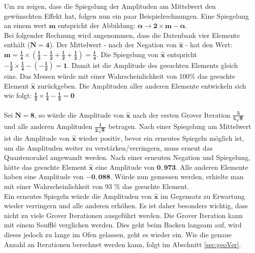 \noindent
Um zu zeigen, dass die Spiegelung der Amplituden am Mittelwert den gewünschten Effekt hat, folgen nun ein paar Beispielrechnungen. Eine Spiegelung an einem wert $\mathbf{m}$ entspricht der Abbildung: $\mathbf{\alpha \rightarrow 2 \times m - \alpha}$. \\
Bei folgender Rechnung wird angenommen, dass die Datenbank vier Elemente enthält ($\mathbf{N=4}$). Der Mittelwert - nach der Negation von $\mathbf{\hat x}$ - hat den Wert: $\mathbf{m = \frac{1}{4} \times (\frac{1}{2}- \frac{1}{2}+ \frac{1}{2} +\frac{1}{2}) = \frac{1}{4}}$. Die Spiegelung von $\mathbf{\hat x}$ entspricht $\mathbf{-\frac{1}{2} \times \frac{1}{4} - (-\frac{1}{2}) = 1}$. Damit ist die Amplitude des gesuchten Elements gleich eins. Das Messen würde mit einer Wahrscheinlichkeit von 100\%  das gesuchte Element $\mathbf{\hat x}$ zurückgeben. Die Amplituden aller anderen Elemente entwickeln sich wie folgt: $\mathbf{\frac{1}{2} \times \frac{1}{4} - \frac{1}{2} = 0}$
\\ \\
Sei $\mathbf{N = 8}$, so würde die Amplitude von $\mathbf{ \hat x}$ nach der ersten Grover Iteration $\mathbf{\frac{5}{5\sqrt 8}}$ und alle anderen Amplituden $\mathbf{\frac{1}{2\sqrt 8}}$ betragen. Nach einer Spiegelung am Mittelwert ist die Amplitude von $\mathbf{\hat x}$ wieder positiv, bevor ein erneutes Spiegeln möglich ist, um die Amplituden weiter zu verstärken/verringern, muss erneut das Quantenorakel angewandt werden. Nach einer erneuten Negation und Spiegelung, hätte das gesuchte Element $\mathbf{\hat x}$ eine Amplitude von $\mathbf{0,973}$. Alle anderen Elemente haben eine Amplitude von $\mathbf{-0, 088}$. Würde nun gemessen werden, erhielte man mit einer Wahrscheinlichkeit von 93 \% das gesuchte Element.
\\ 
Ein erneutes Spiegeln würde die Amplituden von $\mathbf{\hat{x}}$ im Gegensatz zu Erwartung wieder verringern und alle anderen erhöhen. Es ist daher besonders wichtig, dass nicht zu viele Grover Iterationen ausgeführt werden. Die Grover Iteration kann mit einem Souffl\'{e} verglichen werden. Dies geht beim Backen langsam auf, wird dieses jedoch zu lange im Ofen gelassen, geht es wieder ein. Wie die genaue Anzahl an Iterationen berechnet werden kann, folgt im Abschnitt \ref{sec:geoVer}.

